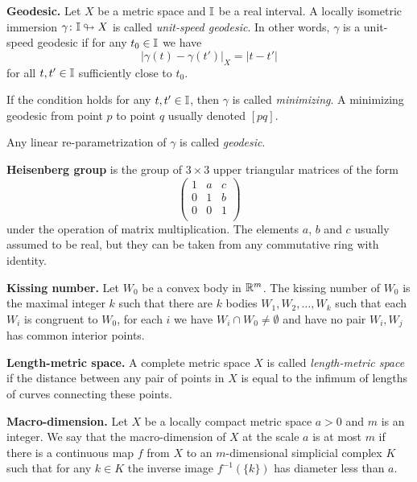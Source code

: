 \begin{description}
\item{\bf Geodesic.}\label{Geodesic}  
Let $X$ be a metric space and $\mathbb{I}$ be a real interval.
A locally isometric immersion $\gamma\colon\mathbb{I}\looparrowright X$ is called \emph{unit-speed geodesic}.
In other words, $\gamma$ is a unit-speed geodesic
if for any $t_0\in\mathbb{I}$ we have 
$$|\gamma(t)-\gamma(t')|_X=|t-t'|$$ 
for all $t,t'\in\mathbb{I}$ sufficiently close to $t_0$.

If the condition holds for any $t,t'\in\mathbb{I}$, then $\gamma$ is called \emph{minimizing}.
A minimizing geodesic from point $p$ to point $q$ usually denoted $[pq]$.

Any linear re-parametrization of $\gamma$ is called \emph{geodesic}.

\item{\bf Heisenberg group}\label{Heisenberg group}
is the group of $3\times3$ upper triangular matrices of the form
\[\begin{pmatrix}
 1 & a & c\\
 0 & 1 & b\\
 0 & 0 & 1\\
\end{pmatrix}\]
under the operation of matrix multiplication. The elements $a$, $b$ and $c$ usually assumed to be real,
but they can be taken from any commutative ring with identity.

\item{\bf Kissing number.}\label{Kissing number}
Let  $W_0$ be a convex body in $\mathbb{R}^m$.
The kissing number of $W_0$ is the maximal integer $k$ such that there are $k$ bodies $W_1,W_2,\dots,W_k$ such that each $W_i$ is congruent to $W_0$,
for each $i$ we have $W_i\cap W_0\not=\emptyset$ and have no pair $W_i,W_j$ has common interior points.

\item{\bf  Length-metric space.}\label{Length-metric space} 
A complete metric space $X$ is called {\it length-metric space}  if the distance between any pair of points in $X$ is equal to the infimum of lengths of curves connecting these points. 

\item{\bf Macro-dimension.}\label{Macro-dimension}
Let $X$ be a locally compact metric space $a>0$ and $m$ is an integer.
We say that the macro-dimension  of $X$ at the scale $a$ is at most $m$
if there is a continuous map $f$ from $X$ to an $m$-dimensional simplicial complex $K$
such that for any $k\in K$ the inverse image $f^{-1}(\{k\})$ has diameter less than $a$.


\end{description}
